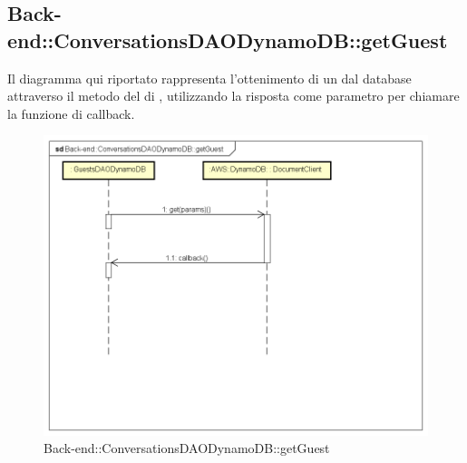 \subsection{Back-end::ConversationsDAODynamoDB::getGuest}
Il diagramma qui riportato rappresenta l'ottenimento di un  dal database attraverso il metodo  del  di , utilizzando la risposta come parametro per chiamare la funzione di callback.
 \begin{figure}[h] \centering \includegraphics[width=\textwidth,height=\textheight,keepaspectratio]{images/diagrams/back-end/Ufficial_Backend/Back-endConversationsDAODynamoDBgetGuest.png} 	\caption{Back-end::ConversationsDAODynamoDB::getGuest}
\end{figure}
\newpage

